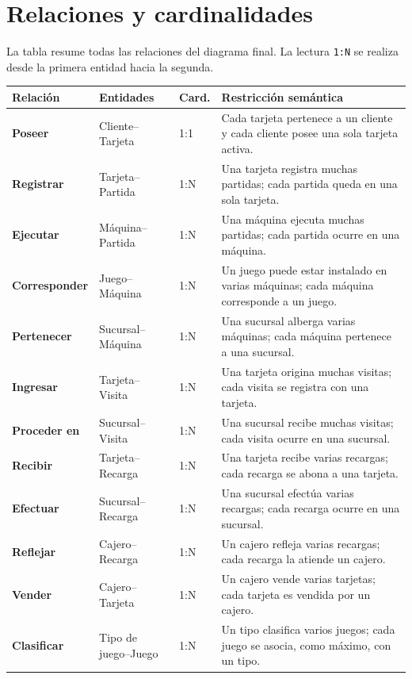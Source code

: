 \clearpage
\section{Relaciones y cardinalidades}

La tabla resume todas las relaciones del diagrama final. La lectura
\texttt{1:N} se realiza desde la primera entidad hacia la segunda.

\begin{center}
\scriptsize
\renewcommand{\arraystretch}{0.94}
\begin{tabularx}{\textwidth}{@{}>{\bfseries\color{unamblue}}p{}p{}p{}X@{}}
\toprule
Relación & Entidades & Card. & Restricción semántica \\
\midrule
Poseer & Cliente--Tarjeta & 1:1 & Cada tarjeta pertenece a un cliente y cada
cliente posee una sola tarjeta activa. \\
Registrar & Tarjeta--Partida & 1:N & Una tarjeta registra muchas partidas;
cada partida queda en una sola tarjeta. \\
Ejecutar & Máquina--Partida & 1:N & Una máquina ejecuta muchas partidas;
cada partida ocurre en una máquina. \\
Corresponder & Juego--Máquina & 1:N & Un juego puede estar instalado en
varias máquinas; cada máquina corresponde a un juego. \\
Pertenecer & Sucursal--Máquina & 1:N & Una sucursal alberga varias máquinas;
cada máquina pertenece a una sucursal. \\
Ingresar & Tarjeta--Visita & 1:N & Una tarjeta origina muchas visitas; cada
visita se registra con una tarjeta. \\
Proceder en & Sucursal--Visita & 1:N & Una sucursal recibe muchas visitas;
cada visita ocurre en una sucursal. \\
Recibir & Tarjeta--Recarga & 1:N & Una tarjeta recibe varias recargas; cada
recarga se abona a una tarjeta. \\
Efectuar & Sucursal--Recarga & 1:N & Una sucursal efectúa varias recargas;
cada recarga ocurre en una sucursal. \\
Reflejar & Cajero--Recarga & 1:N & Un cajero refleja varias recargas; cada
recarga la atiende un cajero. \\
Vender & Cajero--Tarjeta & 1:N & Un cajero vende varias tarjetas; cada tarjeta
es vendida por un cajero. \\
Clasificar & Tipo de juego--Juego & 1:N & Un tipo clasifica varios juegos;
cada juego se asocia, como máximo, con un tipo. \\

\end{tabularx}
\end{center}
